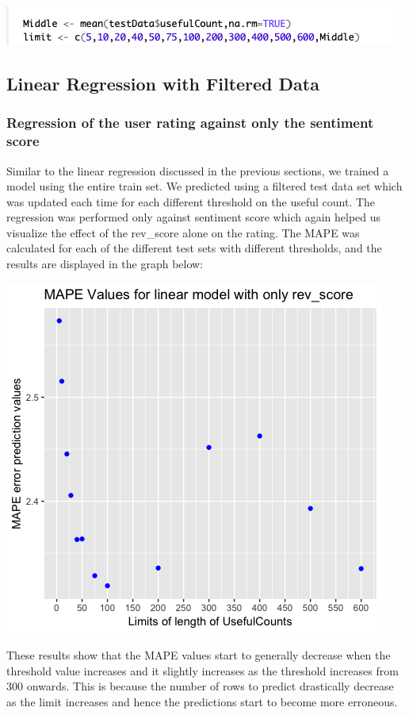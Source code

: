 \documentclass{article}
\begin{document}
\includegraphics[]{usefulCountrange.png}


\subsection{Linear Regression with Filtered Data}
\subsubsection{Regression of the user rating against only the sentiment score}

Similar to the linear regression discussed in the previous sections, we trained a model using the entire train set. We predicted using a filtered test data set which was updated each time for each different threshold on the useful count. The regression was performed only against sentiment score which again helped us visualize the effect of the rev\_score alone on the rating. The MAPE was calculated for each of the different test sets with different thresholds, and the results are displayed in the graph below:

\includegraphics[scale = 0.6]{LRS_filter.png}


These results show that the MAPE values start to generally decrease when the threshold value increases and it slightly increases as the threshold increases from 300 onwards. This is because the number of rows to predict drastically decrease as the limit increases and hence the predictions start to become more erroneous.
\end{document}
